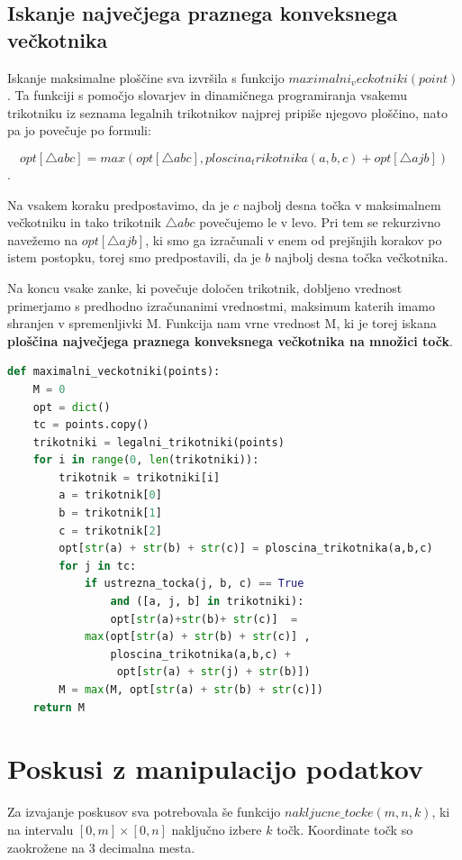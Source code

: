 \documentclass[a4, 12pt]{article}
\begin{document}
\subsection{Iskanje največjega praznega konveksnega večkotnika}

Iskanje maksimalne ploščine sva izvršila s funkcijo $maximalni_veckotniki(point)$. Ta funkciji s pomočjo slovarjev in dinamičnega programiranja vsakemu trikotniku iz seznama legalnih trikotnikov najprej pripiše njegovo ploščino, nato pa jo povečuje po formuli:

$$ opt[\triangle abc]  = max(opt[\triangle abc],  ploscina_trikotnika(a,b,c) + opt[\triangle ajb]) $$.

Na vsakem koraku predpostavimo, da je $c$ najbolj desna točka v maksimalnem večkotniku in tako trikotnik $\triangle abc$ povečujemo le v levo. Pri tem se rekurzivno navežemo na $opt[\triangle ajb]$, ki smo ga izračunali v enem od prejšnjih korakov po istem postopku, torej smo predpostavili, da je $b$ najbolj desna točka večkotnika.

Na koncu vsake zanke, ki povečuje določen trikotnik, dobljeno vrednost primerjamo s predhodno izračunanimi vrednostmi, maksimum katerih imamo shranjen v spremenljivki M. Funkcija nam vrne vrednost M, ki je torej iskana \textbf{ploščina največjega praznega konveksnega večkotnika na množici točk}.


\begin{lstlisting}[language=Python]
def maximalni_veckotniki(points):
    M = 0
    opt = dict()
    tc = points.copy()
    trikotniki = legalni_trikotniki(points)
    for i in range(0, len(trikotniki)):
        trikotnik = trikotniki[i]
        a = trikotnik[0]
        b = trikotnik[1]
        c = trikotnik[2]
        opt[str(a) + str(b) + str(c)] = ploscina_trikotnika(a,b,c)
        for j in tc:
            if ustrezna_tocka(j, b, c) == True 
				and ([a, j, b] in trikotniki):
                opt[str(a)+str(b)+ str(c)]  =
			max(opt[str(a) + str(b) + str(c)] , 
				ploscina_trikotnika(a,b,c) +
				 opt[str(a) + str(j) + str(b)])
        M = max(M, opt[str(a) + str(b) + str(c)])
    return M
\end{lstlisting} 

\section{Poskusi z manipulacijo podatkov}

Za izvajanje poskusov sva potrebovala še funkcijo $nakljucne\_tocke(m, n, k)$, ki na intervalu $[0, m] \times [0,n]$ naključno izbere $k$ točk. Koordinate točk so zaokrožene na 3 decimalna mesta.
\end{document}
